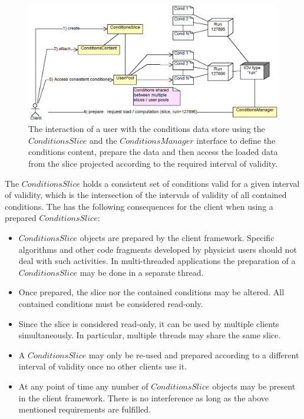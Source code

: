 \documentclass[10pt,a4paper]{article}
\begin{document}
\begin{figure}[h]
  \begin{center}\includegraphics[width=15cm] {DDCond-ConditionsAccess.png}
    \caption{The interaction of a user with the conditions
             data store using the $ConditionsSlice$ and the 
             $ConditionsManager$ interface to define the conditions content, 
             prepare the data and then access the loaded data from the slice
             projected according to the required interval of validity.}
    \label{fig:ddcond-slice-usage}
  \end{center}
\end{figure}
\vspace{-0.5cm}

\noindent
The $ConditionsSlice$ holds a consistent set of conditions valid for a given 
interval of validity, which is the intersection of the intervals of 
validity of all contained conditions. The has the following consequences 
for the client when using a prepared $ConditionsSlice$:
\begin{itemize}
\item $ConditionsSlice$ objects are prepared by the client framework.
      Specific algorithms and other code fragments developed by physicist users
      should not deal with such activities. In multi-threaded applications
      the preparation of a $ConditionsSlice$ may be done in a separate thread.
\item Once prepared, the slice nor the contained conditions may be altered.
      All contained conditions must be considered read-only.
\item Since the slice is considered read-only, it can be used by multiple 
      clients simultaneously. In particular, multiple threads may share 
      the same slice.
\item A $ConditionsSlice$ may only be re-used and prepared according to
      a different interval of validity once no other clients use it.
\item At any point of time any number of $ConditionsSlice$ objects
      may be present in the client framework. There is no interference
      as long as the above mentioned requirements are fulfilled.
\end{itemize}
\end{document}
